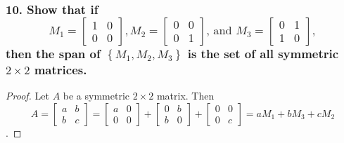 \documentclass{article}
\begin{document}
\subsubsection*{10. Show that if \[
	M_1 = \begin{bmatrix}
		1 & 0 \\ 0 & 0
	\end{bmatrix}, M_2 = \begin{bmatrix}
		0 & 0 \\ 0 & 1
	\end{bmatrix}\text{, and } M_3 = \begin{bmatrix}
		0 & 1 \\ 1 & 0
	\end{bmatrix},
\] then the span of $\left\{M_1, M_2, M_3\right\}$ is the set of all symmetric $2 \times 2$ matrices.}
\begin{proof}
	Let $A$ be a symmetric $2 \times 2$ matrix. Then \[
		A = \begin{bmatrix}
			a & b \\ b & c
		\end{bmatrix} = \begin{bmatrix}
			a & 0 \\ 0 & 0
		\end{bmatrix} + \begin{bmatrix}
			0 & b \\ b & 0
		\end{bmatrix} + \begin{bmatrix}
			0 & 0 \\ 0 & c
		\end{bmatrix} = aM_1 + bM_3 + cM_2
	\].
\end{proof}
\end{document}
